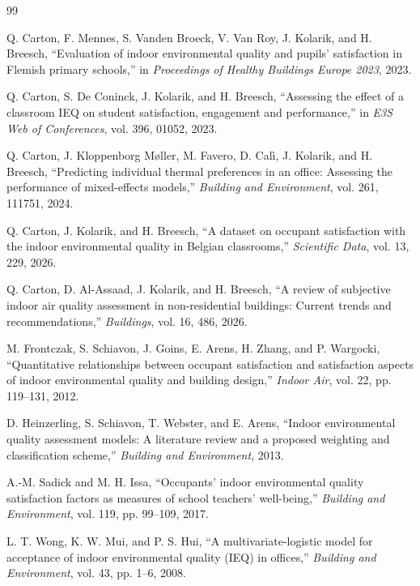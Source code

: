 \documentclass[11pt]{article}
\begin{document}
\begin{thebibliography}{99}

Q. Carton, F. Mennes, S. Vanden Broeck, V. Van Roy, J. Kolarik, and H. Breesch,
``Evaluation of indoor environmental quality and pupils' satisfaction in Flemish primary schools,''
in \emph{Proceedings of Healthy Buildings Europe 2023}, 2023.

Q. Carton, S. De Coninck, J. Kolarik, and H. Breesch,
``Assessing the effect of a classroom IEQ on student satisfaction, engagement and performance,''
in \emph{E3S Web of Conferences}, vol. 396, 01052, 2023.

Q. Carton, J. Kloppenborg Møller, M. Favero, D. Calì, J. Kolarik, and H. Breesch,
``Predicting individual thermal preferences in an office: Assessing the performance of mixed-effects models,''
\emph{Building and Environment}, vol. 261, 111751, 2024.

Q. Carton, J. Kolarik, and H. Breesch,
``A dataset on occupant satisfaction with the indoor environmental quality in Belgian classrooms,''
\emph{Scientific Data}, vol. 13, 229, 2026.

Q. Carton, D. Al-Assaad, J. Kolarik, and H. Breesch,
``A review of subjective indoor air quality assessment in non-residential buildings: Current trends and recommendations,''
\emph{Buildings}, vol. 16, 486, 2026.

M. Frontczak, S. Schiavon, J. Goins, E. Arens, H. Zhang, and P. Wargocki,
``Quantitative relationships between occupant satisfaction and satisfaction aspects of indoor environmental quality and building design,''
\emph{Indoor Air}, vol. 22, pp. 119--131, 2012.

D. Heinzerling, S. Schiavon, T. Webster, and E. Arens,
``Indoor environmental quality assessment models: A literature review and a proposed weighting and classification scheme,''
\emph{Building and Environment}, 2013.

A.-M. Sadick and M. H. Issa,
``Occupants' indoor environmental quality satisfaction factors as measures of school teachers' well-being,''
\emph{Building and Environment}, vol. 119, pp. 99--109, 2017.

L. T. Wong, K. W. Mui, and P. S. Hui,
``A multivariate-logistic model for acceptance of indoor environmental quality (IEQ) in offices,''
\emph{Building and Environment}, vol. 43, pp. 1--6, 2008.

\end{thebibliography}
\end{document}
